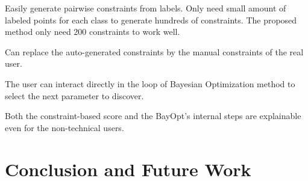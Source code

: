 \par
Easily generate pairwise constraints from labels.
  Only need small amount of labeled points for each class to generate hundreds of constraints.
  The proposed method only need 200 constraints to work well.

\par
Can replace the auto-generated constraints by the manual constraints of the real user.

\par
The user can interact directly in the loop of Bayesian Optimization method to select the next parameter to discover.


\par
Both the constraint-based score and the BayOpt's internal steps are explainable even for the non-technical users. 


\section{Conclusion and Future Work}
